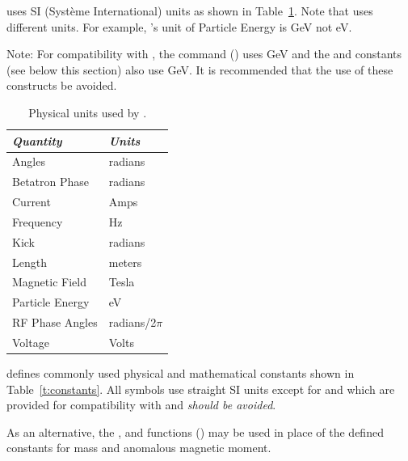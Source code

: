 {{{{{
\bmad uses SI (Syst\`eme International) units as shown in Table~\ref{t:units}.  Note that \mad uses
different units. For example, \mad's unit of Particle Energy is GeV not eV. 

Note: For compatibility with \mad, the  command () uses GeV
and the  and  constants (see below this section) also use GeV. It is recommended that
the use of these constructs be avoided.

\begin{table}[ht]
\centering
\begin{tabular}{ll} \toprule
  {\em Quantity}     & {\em Units}       \\ \midrule
  Angles             &    radians        \\ 
  Betatron Phase     &    radians        \\
  Current            &    Amps           \\ 
  Frequency          &    Hz             \\ 
  Kick               &    radians        \\ 
  Length             &    meters         \\ 
  Magnetic Field     &    Tesla          \\ 
  Particle Energy    &    eV             \\ 
  RF Phase Angles    &    radians/2$\pi$ \\ 
  Voltage            &    Volts          \\ \bottomrule
\end{tabular}
\caption{Physical units used by \bmad.}
\label{t:units}
\end{table}

\bmad defines commonly used physical and mathematical constants shown in Table~\ref{t:constants}.
All symbols use straight SI units except for  and  which are provided for
compatibility with \mad and {\large\em should be avoided}.

As an alternative, the , and  functions
() may be used in place of the defined constants for mass and anomalous
magnetic moment.

}}}}}
